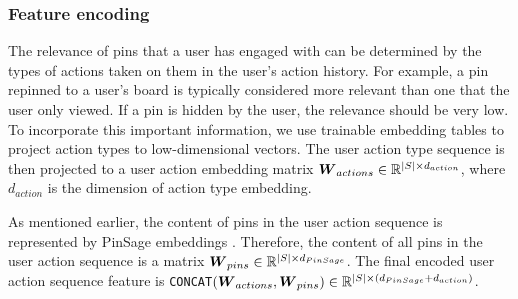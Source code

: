 \subsubsection{Feature encoding}
The relevance of pins that a user has engaged with can be determined by the types of actions taken on them in the user's action history. For example, a pin repinned to a user's board is typically considered more relevant than one that the user only viewed. If a pin is hidden by the user, the relevance should be very low. To incorporate this important information, we use trainable embedding tables to project action types to low-dimensional vectors. The user action type sequence is then projected to a user action embedding matrix $\boldsymbol{W}_{actions} \in \mathbb{R} ^{|S| \times d_{action}}$, where $d_{action}$ is the dimension of action type embedding.

As mentioned earlier, the content of pins in the user action sequence is represented by PinSage embeddings \cite{PinSage}. Therefore, the content of all pins in the user action sequence is a matrix $\boldsymbol{W}_{pins} \in \mathbb{R} ^{|S| \times d_{PinSage}}$. 
The final encoded user action sequence feature is \texttt{CONCAT}$(\boldsymbol{W}_{actions},\boldsymbol{W}_{pins}) \in \mathbb{R} ^{|S| \times (d_{PinSage}+d_{action})}$.

